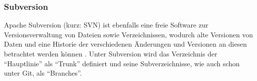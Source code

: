 \subsubsection{Subversion} \label{svn}
Apache Subversion (kurz: SVN) ist ebenfalls eine freie Software zur Versionsverwaltung von Dateien sowie Verzeichnissen, wodurch alte Versionen von Daten und eine Historie der verschiedenen Änderungen und Versionen an diesen betrachtet werden können \cite{Collins-Sussman:2004aa}.
Unter Subversion wird das Verzeichnis der \enquote{Hauptlinie} als \enquote{Trunk} definiert und seine Subverzeichnisse, wie auch schon unter Git, als \enquote{Branches}.
